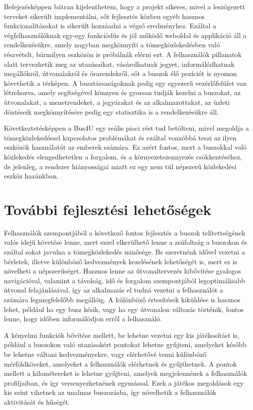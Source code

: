 Befejezésképpen bátran kijelenthetem, hogy a projekt sikeres, mivel a leszögezett terveket sikerült implementálni, sőt fejlesztés közben egyéb hasznos funkcionalitásokat is sikerült hozzáadni a végső eredményhez. Ezáltal a végfelhasználóknak egy-egy funkciódús és jól működő weboldal és applikáció áll a rendelkezésükre, amely nagyban megkönnyíti a tömegközlekedésben való részvételt, bármilyen eszközön is próbálnák elérni ezt. A felhasználók pillanatok alatt tervezhetik meg az utazásaikat, vásárolhatnak jegyet, informálódhatnak megállókról, útvonalakról és órarendekről, sőt a buszok élő pozíciót is nyomon követhetik a térképen. A busztársaságoknak pedig egy egyszerű vezérlőfelület van létrehozva, amely segítségével könnyen és gyorsan tudják kezelni a buszokat, az útvonalakat, a menetrendeket, a jegyárakat és az alkalmazottakat, az üzleti döntéseik megkönnyítésére pedig egy statisztika is a rendelkezésükre áll.

Következtetésképpen a Bus4U egy reális piaci rést tud betölteni, mivel megoldja a tömegközlekedéssel kapcsolatos problémákat és ezáltal vonzóbbá teszi az ilyen eszközök használatát az emberek számára. Ez azért fontos, mert a buszokkal való közlekedés elengedhetetlen a forgalom, és a környezetszennyezés csökkentéséhez, de jelenleg, a rendszer hiányosságai miatt ez egy nem túl népszerű közlekedési eszköz hazánkban.

\section{További fejlesztési lehetőségek}

Felhasználók szempontjából a következő fontos fejlesztés a buszok telítettségének valós idejű követése lenne, mert ezzel elkerülhető lenne a zsúfoltság a buszokon és ezáltal sokat javulna a tömegközlekedés minősége. Be szeretnénk idővel vezetni a bérletek, illetve különböző kedvezmények kezelésének lehetőségét is, mert ez is növelheti a népszerűséget. Hasznos lenne az útvonaltervezés kibővítése gyalogos navigációval, valamint a távolság, idő és forgalom szempontjából legoptimálisabb útvonal felajánlásával, így az alkalmazás el tudná vezetni a felhasználót a számára legmegfelelőbb megállóig. A különböző értesítések kiküldése is hasznos lehet, például ha egy busz késik, vagy ha egy útvonalon változás történik, fontos lenne, hogy időben informálódjon erről a felhasználó.

A kényelmi funkciók bővítése mellett, be lehetne vezetni egy kis játékosítást is, például a buszokon való utazásokért pontokat lehetne gyűjteni, amelyeket később be lehetne váltani kedvezményekre, vagy elérhetővé tenni különböző mérföldköveket, amelyeket a felhasználók elérhetnek és gyűjthetnek. A pontok mellett a kilométereket is lehetne gyűjteni, amelyek megjelennének a felhasználók profiljaiban, és így versenyezhetnének egymással. Ezek a játékos megoldások egy kis színt vihetnek az unalmas buszozásba, így növelhetik a felhasználók aktivitását és hűségét.

